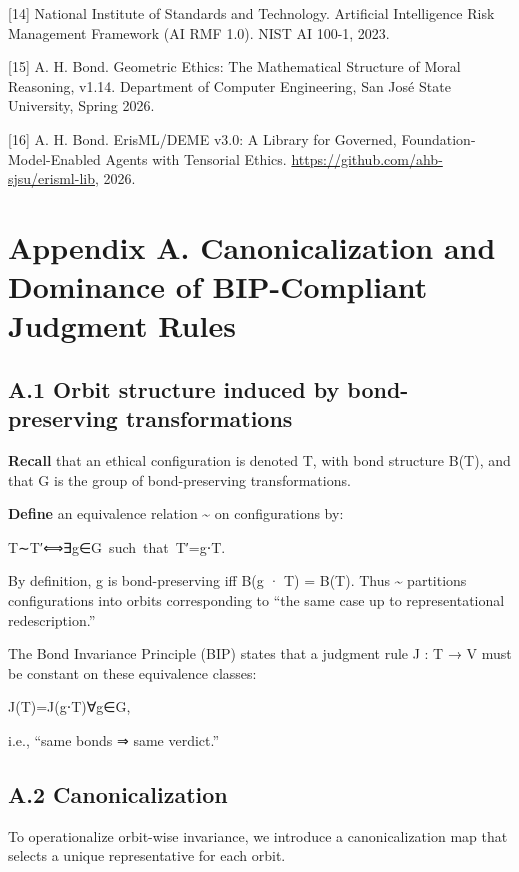 \documentclass[12pt]{article}
\theoremstyle{plain}
\theoremstyle{definition}
\theoremstyle{remark}
\begin{document}
{[}14{]} National Institute of Standards and Technology. Artificial
Intelligence Risk Management Framework (AI RMF 1.0). NIST AI 100-1,
2023.

{[}15{]} A. H. Bond. Geometric Ethics: The Mathematical Structure of
Moral Reasoning, v1.14. Department of Computer Engineering, San Jos\'{e} State University, Spring 2026.

{[}16{]} A. H. Bond. ErisML/DEME v3.0: A Library for Governed,
Foundation-Model-Enabled Agents with Tensorial Ethics.
\url{https://github.com/ahb-sjsu/erisml-lib}, 2026.

\section{Appendix A. Canonicalization and Dominance of BIP-Compliant
Judgment
Rules}\label{appendix-a.-canonicalization-and-dominance-of-bip-compliant-judgment-rules}

\subsection{A.1 Orbit structure induced by bond-preserving
transformations}\label{a.1-orbit-structure-induced-by-bond-preserving-transformations}

\textbf{Recall} that an ethical configuration is denoted T, with bond
structure B(T), and that G is the group of bond-preserving
transformations.

\textbf{Define} an equivalence relation \textasciitilde{} on
configurations by:

T∼T′⟺∃g∈G~such~that~T′=g⋅T.

By definition, g is bond-preserving iff B(g · T) = B(T). Thus
\textasciitilde{} partitions configurations into orbits corresponding to
``the same case up to representational redescription.''

The Bond Invariance Principle (BIP) states that a judgment rule J : T →
V must be constant on these equivalence classes:

J(T)=J(g⋅T)∀g∈G,

i.e., ``same bonds ⇒ same verdict.''

\subsection{A.2 Canonicalization}\label{a.2-canonicalization}

To operationalize orbit-wise invariance, we introduce a canonicalization
map that selects a unique representative for each orbit.
\end{document}
